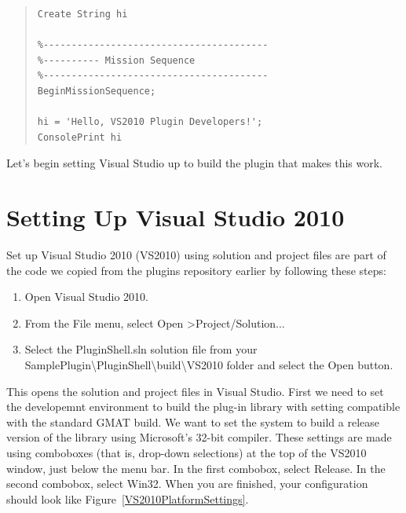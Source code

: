 \documentclass[10pt,letterpaper]{article}
\begin{document}
\begin{quote}
\begin{verbatim}
Create String hi

%----------------------------------------
%---------- Mission Sequence
%----------------------------------------
BeginMissionSequence;

hi = 'Hello, VS2010 Plugin Developers!';
ConsolePrint hi
\end{verbatim}
\end{quote}

\noindent Let's begin setting Visual Studio up to build the plugin that makes this work.

\section{Setting Up Visual Studio 2010}

Set up Visual Studio 2010 (VS2010) using solution and project files are part of the code we copied from the plugins repository earlier by following these steps:

\begin{enumerate}
\item Open Visual Studio 2010.
\item From the File menu, select Open \textgreater Project/Solution...
\item Select the PluginShell.sln solution file from your SamplePlugin{\textbackslash}PluginShell{\textbackslash}build{\textbackslash}VS2010 folder and select the Open button.  
\setcounter{saveenum}{\value{enumi}}
\end{enumerate}

\noindent This opens the solution and project files in Visual Studio.  First we need to set the developemnt environment to build the plug-in library with setting compatible with the standard GMAT build.  We want to set the system to build a release version of the library using Microsoft's 32-bit compiler.  These settings are made using comboboxes (that is, drop-down selections) at the top of the VS2010 window, just below the menu bar.  In the first combobox, select Release.  In the second combobox, select Win32.  When you are finished, your configuration should look like Figure~\ref{VS2010PlatformSettings}.
\end{document}
